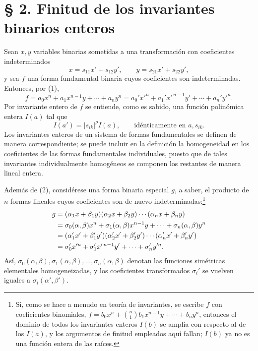 \documentclass[11pt]{article}
\begin{document}
\setcounter{equation}{0}
\section*{§ 2. Finitud de los invariantes binarios enteros}

Sean \(x,y\) variables binarias sometidas a una transformación con coeficientes indeterminados
\begin{equation}
        x=s_{11}x'+s_{12}y',\qquad y=s_{21}x'+s_{22}y',
\end{equation}
y sea \(f\) una forma fundamental binaria cuyos coeficientes son indeterminadas. Entonces, por (1),
\begin{equation}
        f=a_0x^n+a_1x^{n-1}y+\cdots+a_ny^n
        =a_0'x'^n+a_1'x'^{\,n-1}y'+\cdots+a_n'y'^n.
\end{equation}
Por invariante entero de \(f\) se entiende, como es sabido, una función polinómica entera \(I(a)\) tal que
\begin{equation}
        I(a')=|s_{ik}|^\rho I(a),\qquad \text{idénticamente en \(a,s_{ik}\)}.
\end{equation}
Los invariantes enteros de un sistema de formas fundamentales se definen de manera correspondiente; se puede incluir en la definición la homogeneidad en los coeficientes de las formas fundamentales individuales, puesto que de tales invariantes individualmente homogéneos se componen los restantes de manera lineal entera.

Además de (2), considérese una forma binaria especial \(g\), a saber, el producto de \(n\) formas lineales cuyos coeficientes son de nuevo indeterminadas:\footnote{Si, como se hace a menudo en teoría de invariantes, se escribe \(f\) con coeficientes binomiales, \(f=b_0x^n+\binom n1b_1x^{n-1}y+\cdots+b_ny^n\), entonces el dominio de todos los invariantes enteros \(I(b)\) se amplía con respecto al de los \(I(a)\), y los argumentos de finitud empleados aquí fallan; \(I(b)\) ya no es una función entera de las raíces.}
\begin{align}
        g&=(\alpha_1x+\beta_1y)(\alpha_2x+\beta_2y)\cdots(\alpha_nx+\beta_ny)\notag\\
         &=\sigma_0(\alpha,\beta)x^n+\sigma_1(\alpha,\beta)x^{n-1}y+\cdots+\sigma_n(\alpha,\beta)y^n\notag\\
         &=(\alpha_1'x'+\beta_1'y')(\alpha_2'x'+\beta_2'y')\cdots(\alpha_n'x'+\beta_n'y')\notag\\
         &=\sigma_0'x'^n+\sigma_1'x'^{\,n-1}y'+\cdots+\sigma_n'y'^n.
\end{align}
Así, \(\sigma_0(\alpha,\beta),\sigma_1(\alpha,\beta),\ldots,\sigma_n(\alpha,\beta)\) denotan las funciones simétricas elementales homogeneizadas, y los coeficientes transformados \(\sigma_i'\) se vuelven iguales a \(\sigma_i(\alpha',\beta')\).
\end{document}
